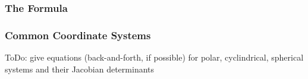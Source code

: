 \subsubsection{The Formula}

\subsubsection{Common Coordinate Systems}
ToDo: give equations (back-and-forth, if possible) for polar, cyclindrical, spherical systems and their Jacobian determinants

\begin{comment}

-Multiple integrals:
-double integrals over:
 -axis-parallel rectangles (simplest case, limits are constants)
 -triangles with two points with same y-coordinate -> y(x) is a linear function
  -can also be done using x(y) - whatever is most convenient
 -general triangles (split into two triangles of the sort above)
 -general polygons (via triangulation)
 -segments of circular annulus -> uses a coordinate transformation to polar coordinates
  -generalization to arbitrary coordinates
-triple integrals over
 -axis parallel cuboids
 -3-simplex (tetrahedron)
 -general polyeders
 -using cyclindrical, spherical and general 3D coordinates
-nD integrals
 
-line integrals (of scalar function),
-line integrals of vector fields (circulation), surface integrals (flux)
-coordinate transformations (polar, cylindricial, spherical, etc. -> jacobian determinant)
 

\end{comment} 